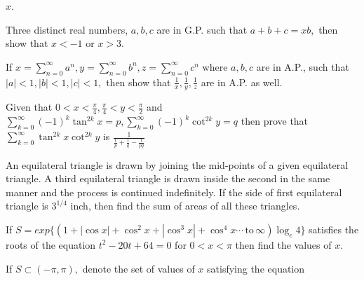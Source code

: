   $x$.
\item Three distinct real numbers, $a, b, c$ are in G.P. such that $a + b + c = xb,$ then show that $x < -1$ or $x > 3$.
\item If $\displaystyle x = \sum_{n=0}^\infty a^n, y = \sum_{n=0}^\infty b^n, z = \sum_{n=0}^\infty c^n$ where $a, b, c$ are in A.P.,
  such that $|a| < 1, |b|< 1, |c| < 1,$ then show that $\frac{1}{x}, \frac{1}{y}, \frac{1}{z}$ are in A.P. as well.
\item Given that $0 < x< \frac{\pi}{4}, \frac{\pi}{4} < y <\frac{\pi}{2}$ and $\displaystyle\sum_{k=0}^\infty(-1)^k\tan^{2k}x = p,
  \sum_{k=0}^\infty(-1)^k\cot^{2k}y = q$ then prove that $\displaystyle\sum_{k = 0}^\infty \tan^{2k}x\cot^{2k}y$ is $\frac{1}{\frac{1}{p} +
    \frac{1}{q} - \frac{1}{pq}}$
\item An equilateral triangle is drawn by joining the mid-points of a given equilateral triangle. A third equilateral
  triangle is drawn inside the second in the same manner and the process is continued indefinitely. If the side of first
  equilateral triangle is $3^{1/4}$ inch, then find the sum of areas of all these triangles.
\item If $S = exp\{(1 + |\cos x| + \cos^2x + |\cos^3x| + \cos^4x \cdots\,\text{to}\,\infty)\log_e 4\}$ satisfies the roots of
  the equation $t^2 - 20t + 64 = 0$ for $0 < x< \pi$ then find the values of $x$.
\item If $S\subset (-\pi, \pi),$ denote the set of values of $x$ satisfying the equation

